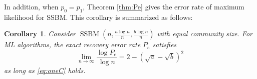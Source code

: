 \documentclass[conference,letterpaper]{IEEEtran}
\newtheorem{theorem}{Theorem}
\newtheorem{corollary}{Corollary}
\DeclareMathOperator{\SSBM}{SSBM}
\begin{document}
In addition, when $p_0=p_1$,
Theorem \ref{thm:Pe} gives the error rate of maximum likelihood for SSBM. This corollary is
summarized as follows:
\begin{corollary}\label{cor:sbm}
Consider $\SSBM(n,\frac{a\log n}{n}, \frac{b \log n}{n})$ with equal community size.
For ML algorithms, the exact recovery error rate $P_e$ satisfies
\begin{equation}\label{eq:cor}
\lim_{n\to \infty} \frac{\log P_e}{\log n} =2-(\sqrt{a} - \sqrt{b})^2
\end{equation}
as long as \eqref{eq:oneC} holds.
\end{corollary}
\end{document}
